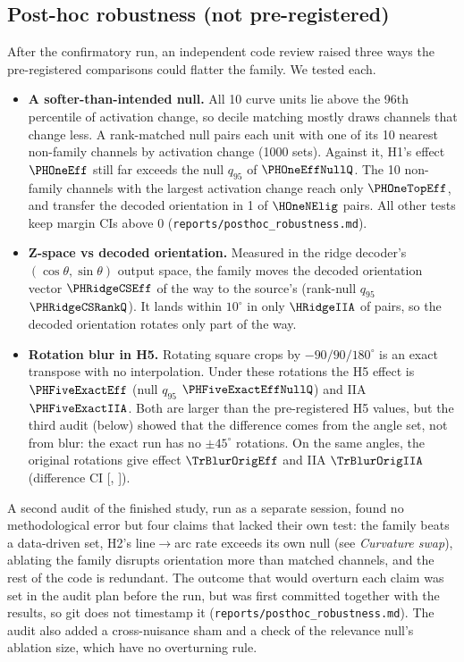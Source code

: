 \documentclass[11pt]{article}
\begin{document}
\subsection{Post-hoc robustness (not pre-registered)}
\label{sec:posthoc}
After the confirmatory run, an independent code review raised three ways the pre-registered comparisons could flatter the family. We tested each.
\begin{itemize}
\item \textbf{A softer-than-intended null.} All 10 curve units lie above the 96th percentile of activation change, so decile matching mostly draws channels that change less. A rank-matched null pairs each unit with one of its 10 nearest non-family channels by activation change (1000 sets). Against it, H1's effect $\PHOneEff$ still far exceeds the null $q_{95}$ of $\PHOneEffNullQ$. The 10 non-family channels with the largest activation change reach only $\PHOneTopEff$, and transfer the decoded orientation in 1 of $\HOneNElig$ pairs. All other tests keep margin CIs above 0 (\texttt{reports/posthoc\_robustness.md}).
\item \textbf{Z-space vs decoded orientation.} Measured in the ridge decoder's $(\cos\theta,\sin\theta)$ output space, the family moves the decoded orientation vector $\PHRidgeCSEff$ of the way to the source's (rank-null $q_{95}$ $\PHRidgeCSRankQ$). It lands within $10^\circ$ in only $\HRidgeIIA$ of pairs, so the decoded orientation rotates only part of the way.
\item \textbf{Rotation blur in H5.} Rotating square crops by $-90/90/180^\circ$ is an exact transpose with no interpolation. Under these rotations the H5 effect is $\PHFiveExactEff$ (null $q_{95}$ $\PHFiveExactEffNullQ$) and IIA $\PHFiveExactIIA$. Both are larger than the pre-registered H5 values, but the third audit (below) showed that the difference comes from the angle set, not from blur: the exact run has no $\pm45^\circ$ rotations. On the same angles, the original rotations give effect $\TrBlurOrigEff$ and IIA $\TrBlurOrigIIA$ (difference CI [\TrBlurDiffLo, \TrBlurDiffHi]).
\end{itemize}
A second audit of the finished study, run as a separate session, found no methodological error but four claims that lacked their own test: the family beats a data-driven set, H2's line$\to$arc rate exceeds its own null (see \emph{Curvature swap}), ablating the family disrupts orientation more than matched channels, and the rest of the code is redundant. The outcome that would overturn each claim was set in the audit plan before the run, but was first committed together with the results, so git does not timestamp it (\texttt{reports/posthoc\_robustness.md}). The audit also added a cross-nuisance sham and a check of the relevance null's ablation size, which have no overturning rule.
\end{document}
